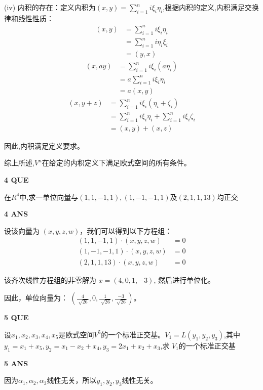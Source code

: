 \documentclass[11pt,letterpaper]{ctexart}
\begin{document}
\begin{enumerate}
(iv) 内积的存在：定义内积为$(x, y) = \sum_{i=1}^ni\xi_i\eta_i$,根据内积的定义,内积满足交换律和线性性质：
\begin{align*}
(x, y) &= \sum_{i=1}^ni\xi_i\eta_i \\
&= \sum_{i=1}^ni\eta_i\xi_i \\
&= (y, x)
\end{align*}
\begin{align*}
(x, ay) &= \sum_{i=1}^ni\xi_i(a\eta_i) \\
&= a\sum_{i=1}^ni\xi_i\eta_i \\
&= a(x, y)
\end{align*}
\begin{align*}
(x, y+z) &= \sum_{i=1}^ni\xi_i(\eta_i+\zeta_i) \\
&= \sum_{i=1}^ni\xi_i\eta_i + \sum_{i=1}^ni\xi_i\zeta_i \\
&= (x, y) + (x, z)
\end{align*}

因此,内积满足定义要求。

综上所述,$V^n$在给定的内积定义下满足欧式空间的所有条件。
	


\textbf{4 QUE}
\bigskip

	在$R^4$中,求一单位向量与$(1, 1, -1, 1), (1, -1, -1, 1)$及$(2,1,1,13)$均正交

\textbf{4 ANS}
\bigskip

设该向量为 $(x, y, z, w)$，我们可以得到以下方程组：
\[ \begin{aligned}
(1, 1, -1, 1) \cdot (x, y, z, w) &= 0 \\
(1, -1, -1, 1) \cdot (x, y, z, w) &= 0 \\
(2, 1, 1, 13) \cdot (x, y, z, w) &= 0
\end{aligned}\]

该齐次线性方程组的非零解为 $x = (4, 0, 1, -3)$, 然后进行单位化。

因此，单位向量为：
$(\frac{4}{\sqrt[]{26}}, 0, \frac{1}{\sqrt[]{26}}, \frac{-3}{\sqrt[]{26}})$。




\textbf{5 QUE}
\bigskip

设$x_1, x_2, x_3, x_4, x_5$是欧式空间$V^5$的一个标准正交基。$V_1 = L(y_1, y_2, y_3)$,其中$y_1 = x_1 + x_5, y_2 = x_1 - x_2 + x_4, y_3 = 2x_1 + x_2 +x_3$,求
$V_1$的一个标准正交基

\textbf{5 ANS}
\bigskip


因为$\alpha_1, \alpha_2,\alpha_3$线性无关，所以$y_1, y_2, y_3$线性无关。


\end{enumerate}
\end{document}
